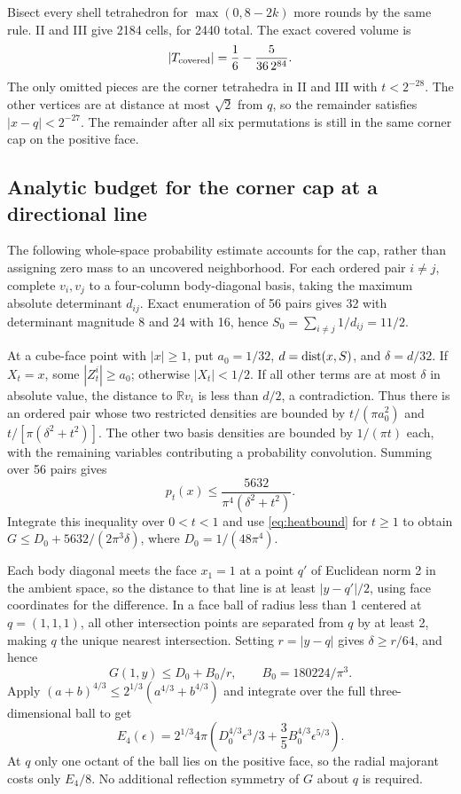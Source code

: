 \documentclass[11pt,a4paper]{article}
\theoremstyle{remark}\newtheorem{remark}[theorem]{Remark}
\newcommand{\R}{\mathbb R}\newcommand{\dd}{\,\mathrm d}
\newcommand{\1}{\mathbf1}\newcommand{\pos}[1]{(#1)_+}
\begin{document}
Bisect every shell tetrahedron for $\max(0,8-2k)$ more rounds by the same rule. II and III give 2184 cells, for 2440 total. The exact covered volume is
\[
 |T_{\rm covered}|=\frac16-\frac5{36\,2^{84}}.
\]
The only omitted pieces are the corner tetrahedra in II and III with $t<2^{-28}$. The other vertices are at distance at most $\sqrt2$ from $q$, so the remainder satisfies $|x-q|<2^{-27}$. The remainder after all six permutations is still in the same corner cap on the positive face.

\subsection{Analytic budget for the corner cap at a directional line}
The following whole-space probability estimate accounts for the cap, rather than assigning zero mass to an uncovered neighborhood. For each ordered pair $i\ne j$, complete $v_i,v_j$ to a four-column body-diagonal basis, taking the maximum absolute determinant $d_{ij}$. Exact enumeration of 56 pairs gives 32 with determinant magnitude 8 and 24 with 16, hence $S_0=\sum_{i\ne j}1/d_{ij}=11/2$.

At a cube-face point with $|x|\ge1$, put $a_0=1/32$, $d=\operatorname{dist}(x,S)$, and $\delta=d/32$. If $X_t=x$, some $|Z_t^i|\ge a_0$; otherwise $|X_t|<1/2$. If all other terms are at most $\delta$ in absolute value, the distance to $\R v_i$ is less than $d/2$, a contradiction. Thus there is an ordered pair whose two restricted densities are bounded by $t/(\pi a_0^2)$ and $t/[\pi(\delta^2+t^2)]$. The other two basis densities are bounded by $1/(\pi t)$ each, with the remaining variables contributing a probability convolution. Summing over 56 pairs gives
\[
 p_t(x)\le\frac{5632}{\pi^4(\delta^2+t^2)}.
\]
Integrate this inequality over $0<t<1$ and use \eqref{eq:heatbound} for $t\ge1$ to obtain
$G\le D_0+5632/(2\pi^3\delta)$, where $D_0=1/(48\pi^4)$.

Each body diagonal meets the face $x_1=1$ at a point $q'$ of Euclidean norm 2 in the ambient space, so the distance to that line is at least $|y-q'|/2$, using face coordinates for the difference. In a face ball of radius less than 1 centered at $q=(1,1,1)$, all other intersection points are separated from $q$ by at least 2, making $q$ the unique nearest intersection. Setting $r=|y-q|$ gives $\delta\ge r/64$, and hence
\begin{equation}\label{eq:capbound}
 G(1,y)\le D_0+B_0/r,\qquad B_0=180224/\pi^3.
\end{equation}
Apply $(a+b)^{4/3}\le2^{1/3}(a^{4/3}+b^{4/3})$ and integrate over the full three-dimensional ball to get
\begin{equation}\label{eq:cap}
 E_4(\epsilon)=2^{1/3}4\pi\left( D_0^{4/3}\epsilon^3/3+
 \frac35B_0^{4/3}\epsilon^{5/3}\right).
\end{equation}
At $q$ only one octant of the ball lies on the positive face, so the radial majorant costs only $E_4/8$. No additional reflection symmetry of $G$ about $q$ is required.
\end{document}
